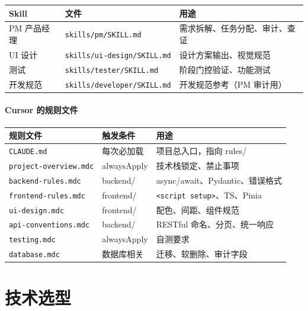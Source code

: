 \documentclass[11pt,a4paper]{article}
\begin{document}
\begin{table}[h]
\centering
\begin{tabular}{lll}
\toprule
\textbf{Skill} & \textbf{文件} & \textbf{用途} \\
\midrule
PM 产品经理 & \texttt{skills/pm/SKILL.md} & 需求拆解、任务分配、审计、查证 \\
UI 设计 & \texttt{skills/ui-design/SKILL.md} & 设计方案输出、视觉规范 \\
测试 & \texttt{skills/tester/SKILL.md} & 阶段门控验证、功能测试 \\
开发规范 & \texttt{skills/developer/SKILL.md} & 开发规范参考（PM 审计用） \\
\bottomrule
\end{tabular}
\end{table}

\subsection{Cursor 的规则文件}

\begin{table}[h]
\centering
\begin{tabular}{lll}
\toprule
\textbf{规则文件} & \textbf{触发条件} & \textbf{用途} \\
\midrule
\texttt{CLAUDE.md} & 每次必加载 & 项目总入口，指向 rules/ \\
\texttt{project-overview.mdc} & alwaysApply & 技术栈锁定、禁止事项 \\
\texttt{backend-rules.mdc} & backend/ & async/await、Pydantic、错误格式 \\
\texttt{frontend-rules.mdc} & frontend/ & \texttt{<script setup>}、TS、Pinia \\
\texttt{ui-design.mdc} & frontend/ & 配色、间距、组件规范 \\
\texttt{api-conventions.mdc} & backend/ & RESTful 命名、分页、统一响应 \\
\texttt{testing.mdc} & alwaysApply & 自测要求 \\
\texttt{database.mdc} & 数据库相关 & 迁移、软删除、审计字段 \\
\bottomrule
\end{tabular}
\end{table}

\part{技术选型}
\end{document}
